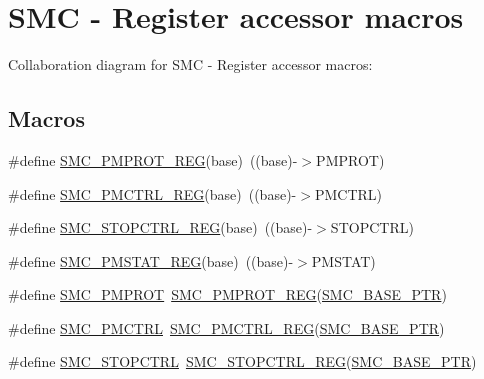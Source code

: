 \hypertarget{group___s_m_c___register___accessor___macros}{}\section{S\+MC -\/ Register accessor macros}
\label{group___s_m_c___register___accessor___macros}
Collaboration diagram for S\+MC -\/ Register accessor macros\+:
\subsection*{Macros}
\begin{DoxyCompactItemize}
\item 
\#define \hyperlink{group___s_m_c___register___accessor___macros_ga8faa7aff53d9f78046264ed895ba4bcc}{S\+M\+C\+\_\+\+P\+M\+P\+R\+O\+T\+\_\+\+R\+EG}(base)~((base)-\/$>$P\+M\+P\+R\+OT)
\item 
\#define \hyperlink{group___s_m_c___register___accessor___macros_gaca57398aaa8f982675e83347cc971a66}{S\+M\+C\+\_\+\+P\+M\+C\+T\+R\+L\+\_\+\+R\+EG}(base)~((base)-\/$>$P\+M\+C\+T\+RL)
\item 
\#define \hyperlink{group___s_m_c___register___accessor___macros_ga73be366508cb32f8bc1aad7ac106268c}{S\+M\+C\+\_\+\+S\+T\+O\+P\+C\+T\+R\+L\+\_\+\+R\+EG}(base)~((base)-\/$>$S\+T\+O\+P\+C\+T\+RL)
\item 
\#define \hyperlink{group___s_m_c___register___accessor___macros_ga9d5f2b2a54cff2641473312ac780203e}{S\+M\+C\+\_\+\+P\+M\+S\+T\+A\+T\+\_\+\+R\+EG}(base)~((base)-\/$>$P\+M\+S\+T\+AT)
\item 
\#define \hyperlink{group___s_m_c___register___accessor___macros_ga43f6628ef790c765722cee208c2c477d}{S\+M\+C\+\_\+\+P\+M\+P\+R\+OT}~\hyperlink{group___s_m_c___register___accessor___macros_ga8faa7aff53d9f78046264ed895ba4bcc}{S\+M\+C\+\_\+\+P\+M\+P\+R\+O\+T\+\_\+\+R\+EG}(\hyperlink{group___s_m_c___peripheral_ga31b6c4571795341e6446800243313e56}{S\+M\+C\+\_\+\+B\+A\+S\+E\+\_\+\+P\+TR})
\item 
\#define \hyperlink{group___s_m_c___register___accessor___macros_ga4b2bae0309aecee21e9fe70ac7dbe3dc}{S\+M\+C\+\_\+\+P\+M\+C\+T\+RL}~\hyperlink{group___s_m_c___register___accessor___macros_gaca57398aaa8f982675e83347cc971a66}{S\+M\+C\+\_\+\+P\+M\+C\+T\+R\+L\+\_\+\+R\+EG}(\hyperlink{group___s_m_c___peripheral_ga31b6c4571795341e6446800243313e56}{S\+M\+C\+\_\+\+B\+A\+S\+E\+\_\+\+P\+TR})
\item 
\#define \hyperlink{group___s_m_c___register___accessor___macros_ga30413a73d6f7e296acd7d1857ebf213e}{S\+M\+C\+\_\+\+S\+T\+O\+P\+C\+T\+RL}~\hyperlink{group___s_m_c___register___accessor___macros_ga73be366508cb32f8bc1aad7ac106268c}{S\+M\+C\+\_\+\+S\+T\+O\+P\+C\+T\+R\+L\+\_\+\+R\+EG}(\hyperlink{group___s_m_c___peripheral_ga31b6c4571795341e6446800243313e56}{S\+M\+C\+\_\+\+B\+A\+S\+E\+\_\+\+P\+TR})

\end{DoxyCompactItemize}
